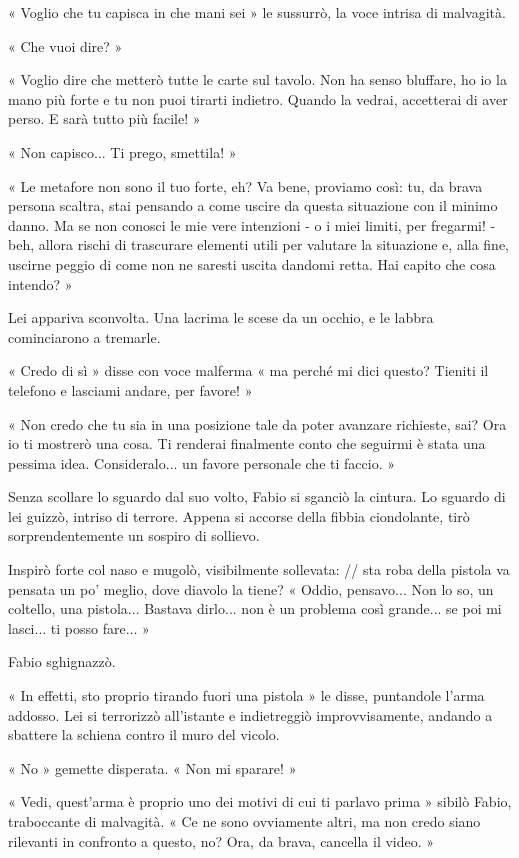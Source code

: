 « Voglio che tu capisca in che mani sei » le sussurrò, la voce intrisa di malvagità.

« Che vuoi dire? »

« Voglio dire che metterò tutte le carte sul tavolo. Non ha senso bluffare, ho io la mano più forte e tu non puoi tirarti indietro. Quando la vedrai, accetterai di aver perso. E sarà tutto più facile! »

« Non capisco... Ti prego, smettila! »

« Le metafore non sono il tuo forte, eh? Va bene, proviamo così: tu, da brava persona scaltra, stai pensando a come uscire da questa situazione con il minimo danno. Ma se non conosci le mie vere intenzioni - o i miei limiti, per fregarmi! - beh, allora rischi di trascurare elementi utili per valutare la situazione e, alla fine, uscirne peggio di come non ne saresti uscita dandomi retta. Hai capito che cosa intendo? »

Lei appariva sconvolta. Una lacrima le scese da un occhio, e le labbra cominciarono a tremarle.

« Credo di sì » disse con voce malferma « ma perché mi dici questo? Tieniti il telefono e lasciami andare, per favore! »

« Non credo che tu sia in una posizione tale da poter avanzare richieste, sai? Ora io ti mostrerò una cosa. Ti renderai finalmente conto che seguirmi è stata una pessima idea. Consideralo... un favore personale che ti faccio. »

Senza scollare lo sguardo dal suo volto, Fabio si sganciò la cintura. Lo sguardo di lei guizzò, intriso di terrore. Appena si accorse della fibbia ciondolante, tirò sorprendentemente un sospiro di sollievo.

Inspirò forte col naso e mugolò, visibilmente sollevata:
// sta roba della pistola va pensata un po' meglio, dove diavolo la tiene?
« Oddio, pensavo... Non lo so, un coltello, una pistola... Bastava dirlo... non è un problema così grande... se poi mi lasci... ti posso fare... »

Fabio sghignazzò.

« In effetti, sto proprio tirando fuori una pistola » le disse, puntandole l'arma addosso. Lei si terrorizzò all'istante e indietreggiò improvvisamente, andando a sbattere la schiena contro il muro del vicolo.

« No » gemette disperata. « Non mi sparare! »

« Vedi, quest'arma è proprio uno dei motivi di cui ti parlavo prima » sibilò Fabio, traboccante di malvagità. « Ce ne sono ovviamente altri, ma non credo siano rilevanti in confronto a questo, no? Ora, da brava, cancella il video. »

